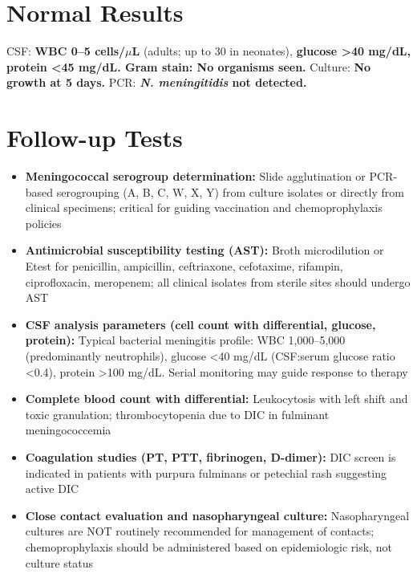 \section*{Normal Results}
CSF: \textbf{WBC 0--5 cells/$\mu$L} (adults; up to 30 in neonates), \textbf{glucose >40 mg/dL, protein <45 mg/dL. Gram stain: No organisms seen.} Culture: \textbf{No growth at 5 days.} PCR: \textbf{\textit{N. meningitidis} not detected.}

\section*{Follow-up Tests}
\begin{itemize}
  \item \textbf{Meningococcal serogroup determination:} Slide agglutination or PCR-based serogrouping (A, B, C, W, X, Y) from culture isolates or directly from clinical specimens; critical for guiding vaccination and chemoprophylaxis policies
  \item \textbf{Antimicrobial susceptibility testing (AST):} Broth microdilution or Etest for penicillin, ampicillin, ceftriaxone, cefotaxime, rifampin, ciprofloxacin, meropenem; all clinical isolates from sterile sites should undergo AST
  \item \textbf{CSF analysis parameters (cell count with differential, glucose, protein):} Typical bacterial meningitis profile: WBC 1,000--5,000 (predominantly neutrophils), glucose <40 mg/dL (CSF:serum glucose ratio <0.4), protein >100 mg/dL. Serial monitoring may guide response to therapy
  \item \textbf{Complete blood count with differential:} Leukocytosis with left shift and toxic granulation; thrombocytopenia due to DIC in fulminant meningococcemia
  \item \textbf{Coagulation studies (PT, PTT, fibrinogen, D-dimer):} DIC screen is indicated in patients with purpura fulminans or petechial rash suggesting active DIC
  \item \textbf{Close contact evaluation and nasopharyngeal culture:} Nasopharyngeal cultures are NOT routinely recommended for management of contacts; chemoprophylaxis should be administered based on epidemiologic risk, not culture status
\end{itemize}

